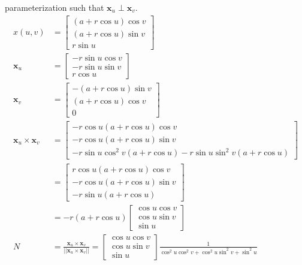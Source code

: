 \documentclass[12pt,letterpaper]{hmcpset}
\begin{document}
parameterization such that $\mathbf{x}_u \perp \mathbf{x}_v$. \\
\begin{align*}
  x(u, v) &= \begin{bmatrix}
    (a + r\cos u) \cos v \\
    (a + r\cos u) \sin v \\
    r\sin u
    \end{bmatrix} \\
  \mathbf{x}_u &=
  \begin{bmatrix}
    -r\sin u \cos v \\
    -r \sin u \sin v \\
    r\cos u
  \end{bmatrix} \\
  \mathbf{x}_v &=
  \begin{bmatrix}
    -(a + r\cos u) \sin v \\
    (a + r \cos u) \cos v \\
    0
  \end{bmatrix} \\
  \mathbf{x}_u \times \mathbf{x}_v &= \begin{bmatrix}-r\cos u (a + r \cos u) \cos v\\-r\cos u (a + r\cos u) \sin v\\-r\sin u \cos^2v  (a + r \cos
    u) - r \sin u \sin^2 v (a + r\cos u)\end{bmatrix} \\
                              &= \begin{bmatrix}r\cos u (a + r \cos u) \cos v\\-r\cos u (a + r\cos u) \sin v\\-r\sin u  (a + r \cos
    u) \end{bmatrix}\\
                              &= -r(a + r\cos u)\begin{bmatrix}\cos u \cos v\\\cos u \sin v\\\sin u \end{bmatrix} \\
  N &= \frac{\mathbf{x}_u \times \mathbf{x}_v}{||\mathbf{x}_u \times \mathbf{x}_v||}
= \begin{bmatrix}\cos u \cos v\\\cos u \sin v\\\sin u 
    \end{bmatrix} \frac{1}{\cos^2u\cos^2v + \cos^2 u \sin^2 v +
  \sin^2u} \\

\end{align*}
\end{document}
